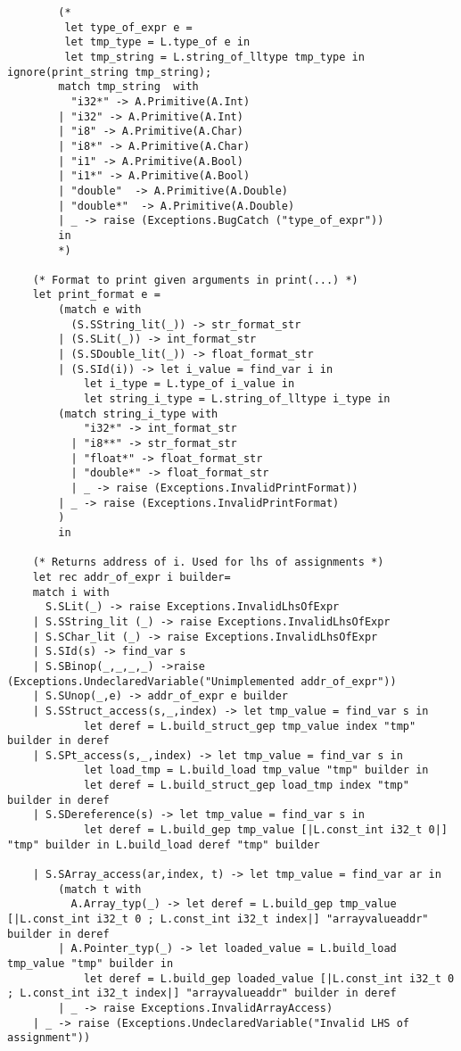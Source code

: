 \documentclass{article}
\begin{document}
\begin{lstlisting}
		(*
		 let type_of_expr e =
		 let tmp_type = L.type_of e in
		 let tmp_string = L.string_of_lltype tmp_type in ignore(print_string tmp_string);
		match tmp_string  with 
	  	  "i32*" -> A.Primitive(A.Int)
	  	| "i32" -> A.Primitive(A.Int)
	  	| "i8" -> A.Primitive(A.Char)
	  	| "i8*" -> A.Primitive(A.Char)
	  	| "i1" -> A.Primitive(A.Bool)
		| "i1*" -> A.Primitive(A.Bool)
		| "double"  -> A.Primitive(A.Double) 
		| "double*"  -> A.Primitive(A.Double) 
		| _ -> raise (Exceptions.BugCatch ("type_of_expr"))
		in 
		*)

	(* Format to print given arguments in print(...) *)
	let print_format e =
		(match e with 
		  (S.SString_lit(_)) -> str_format_str
		| (S.SLit(_)) -> int_format_str
		| (S.SDouble_lit(_)) -> float_format_str
		| (S.SId(i)) -> let i_value = find_var i in 
			let i_type = L.type_of i_value in 
			let string_i_type = L.string_of_lltype i_type in 
		(match string_i_type with 
		    "i32*" -> int_format_str 
		  | "i8**" -> str_format_str
		  | "float*" -> float_format_str
		  | "double*" -> float_format_str
		  | _ -> raise (Exceptions.InvalidPrintFormat))		
		| _ -> raise (Exceptions.InvalidPrintFormat) 
		)
		in

	(* Returns address of i. Used for lhs of assignments *)
	let rec addr_of_expr i builder= 
	match i with
	  S.SLit(_) -> raise Exceptions.InvalidLhsOfExpr
	| S.SString_lit (_) -> raise Exceptions.InvalidLhsOfExpr
	| S.SChar_lit (_) -> raise Exceptions.InvalidLhsOfExpr
 	| S.SId(s) -> find_var s
	| S.SBinop(_,_,_,_) ->raise (Exceptions.UndeclaredVariable("Unimplemented addr_of_expr"))
 	| S.SUnop(_,e) -> addr_of_expr e builder
	| S.SStruct_access(s,_,index) -> let tmp_value = find_var s in 
			let deref = L.build_struct_gep tmp_value index "tmp" builder in deref
	| S.SPt_access(s,_,index) -> let tmp_value = find_var s in 
			let load_tmp = L.build_load tmp_value "tmp" builder in 
			let deref = L.build_struct_gep load_tmp index "tmp" builder in deref
	| S.SDereference(s) -> let tmp_value = find_var s in 
			let deref = L.build_gep tmp_value [|L.const_int i32_t 0|] "tmp" builder in L.build_load deref "tmp" builder

	| S.SArray_access(ar,index, t) -> let tmp_value = find_var ar in 
		(match t with 
		  A.Array_typ(_) -> let deref = L.build_gep tmp_value [|L.const_int i32_t 0 ; L.const_int i32_t index|] "arrayvalueaddr" builder in deref 
		| A.Pointer_typ(_) -> let loaded_value = L.build_load tmp_value "tmp" builder in 
			let deref = L.build_gep loaded_value [|L.const_int i32_t 0 ; L.const_int i32_t index|] "arrayvalueaddr" builder in deref 
		| _ -> raise Exceptions.InvalidArrayAccess)
	| _ -> raise (Exceptions.UndeclaredVariable("Invalid LHS of assignment"))


\end{lstlisting}
\end{document}
